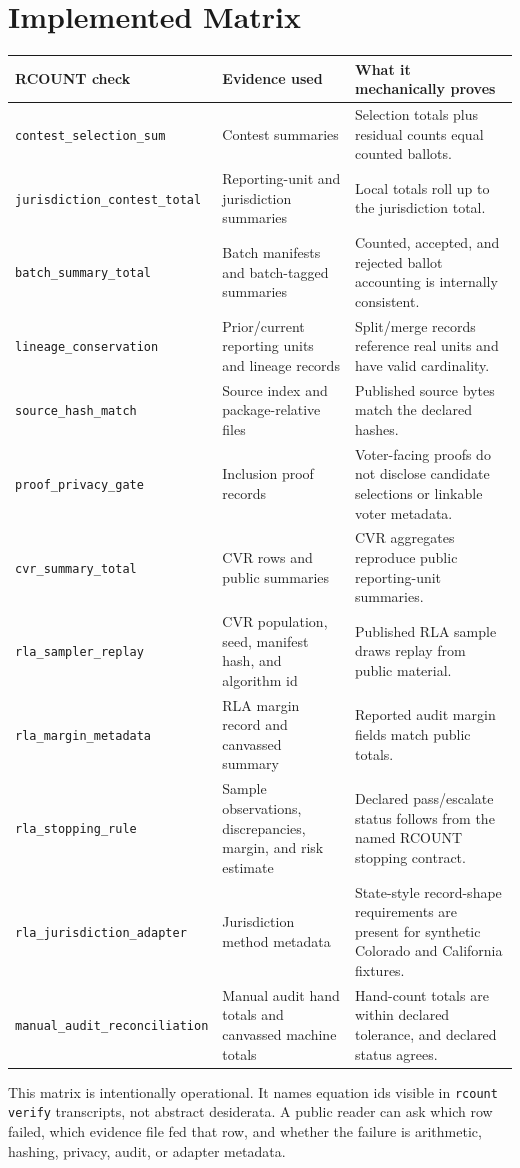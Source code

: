 \section{Implemented Matrix}

\begin{center}
\small
\begin{tabularx}{\textwidth}{lXX}
\toprule
RCOUNT check & Evidence used & What it mechanically proves \\
\midrule
\texttt{contest\_selection\_sum} & Contest summaries & Selection totals plus residual counts equal counted ballots. \\
\texttt{jurisdiction\_contest\_total} & Reporting-unit and jurisdiction summaries & Local totals roll up to the jurisdiction total. \\
\texttt{batch\_summary\_total} & Batch manifests and batch-tagged summaries & Counted, accepted, and rejected ballot accounting is internally consistent. \\
\texttt{lineage\_conservation} & Prior/current reporting units and lineage records & Split/merge records reference real units and have valid cardinality. \\
\texttt{source\_hash\_match} & Source index and package-relative files & Published source bytes match the declared hashes. \\
\texttt{proof\_privacy\_gate} & Inclusion proof records & Voter-facing proofs do not disclose candidate selections or linkable voter metadata. \\
\texttt{cvr\_summary\_total} & CVR rows and public summaries & CVR aggregates reproduce public reporting-unit summaries. \\
\texttt{rla\_sampler\_replay} & CVR population, seed, manifest hash, and algorithm id & Published RLA sample draws replay from public material. \\
\texttt{rla\_margin\_metadata} & RLA margin record and canvassed summary & Reported audit margin fields match public totals. \\
\texttt{rla\_stopping\_rule} & Sample observations, discrepancies, margin, and risk estimate & Declared pass/escalate status follows from the named RCOUNT stopping contract. \\
\texttt{rla\_jurisdiction\_adapter} & Jurisdiction method metadata & State-style record-shape requirements are present for synthetic Colorado and California fixtures. \\
\texttt{manual\_audit\_reconciliation} & Manual audit hand totals and canvassed machine totals & Hand-count totals are within declared tolerance, and declared status agrees. \\
\bottomrule
\end{tabularx}
\end{center}

This matrix is intentionally operational. It names equation ids visible in
\texttt{rcount verify} transcripts, not abstract desiderata. A public reader
can ask which row failed, which evidence file fed that row, and whether the
failure is arithmetic, hashing, privacy, audit, or adapter metadata.
